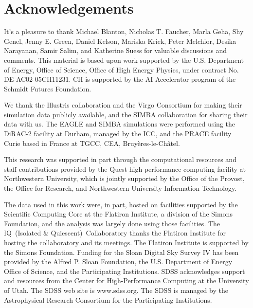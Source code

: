 \documentclass{aastex63}
\begin{document}
\NewPageAfterKeywords


 






\section*{Acknowledgements}
It's a pleasure to thank 
    Michael Blanton, 
    Nicholas T. Faucher, 
    Marla Geha, 
    Shy Genel,
    Jenny E. Green,
    Daniel Kelson, 
    Mariska Kriek, 
    Peter Melchior, 
    Desika Narayanan, 
    Samir Salim, 
    and Katherine Suess for
valuable discussions and comments.
This material is based upon work supported by the U.S. Department of Energy,
Office of Science, Office of High Energy Physics, under contract No.
DE-AC02-05CH11231. 
CH is supported by the AI Accelerator program of the Schmidt Futures Foundation.

We thank the Illustris collaboration and the Virgo Consortium for making their
simulation data publicly available, and the SIMBA collaboration for sharing
their data with us.
The EAGLE and SIMBA simulations were performed using the DiRAC-2 facility at
Durham, managed by the ICC, and the PRACE facility Curie based in France at
TGCC, CEA, Bruy\`{e}res-le-Ch\^{a}tel.

This research was supported in part through the computational resources and
staff contributions provided by the Quest high performance computing facility
at Northwestern University, which is jointly supported by the Office of the
Provost, the Office for Research, and Northwestern University Information
Technology. 

The data used in this work were, in part, hosted on facilities supported by the
Scientific Computing Core at the Flatiron Institute, a division of the Simons
Foundation, and the analysis was largely done using those facilities.
The IQ~(Isolated \& Quiescent)~Collaboratory thanks the Flatiron Institute for hosting the collaboratory and its meetings. 
The Flatiron Institute is supported by the Simons Foundation.
Funding for the Sloan Digital Sky Survey IV has been provided by the Alfred P.
Sloan Foundation, the U.S. Department of Energy Office of Science, and the
Participating Institutions. SDSS acknowledges support and resources from the
Center for High-Performance Computing at the University of Utah. The SDSS web
site is www.sdss.org.
The SDSS is managed by the Astrophysical Research Consortium for the
Participating Institutions.

\appendix
%
% 
 



 
\end{document}
